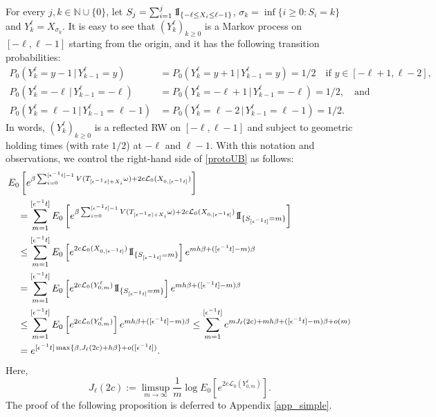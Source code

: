 \documentclass[a4paper]{amsart}
\numberwithin{equation}{section}
\theoremstyle{plain}
\theoremstyle{remark}
\begin{document}
For every $j,k\in\mathbb{N}\cup\{0\}$, let $S_j = \sum_{i=1}^j{{{\rm 1\mkern-1.5mu}\!{\rm I}}}_{\{-\ell \le X_i \le\ell-1\}}$, $\sigma_k = \inf\{i\ge0: S_i = k\}$ and $Y_k^\ell = X_{\sigma_k}$. It is easy to see that $(Y_k^\ell)_{k\ge0}$ is a Markov process on $[-\ell,\ell-1]$ starting from the origin, and it has the following transition probabilities:
\begin{equation}
\begin{aligned}\label{tantana}
P_0(Y_k^\ell = y - 1\,|\,Y_{k-1}^\ell = y) &= P_0(Y_k^\ell = y + 1\,|\,Y_{k-1}^\ell = y) = 1/2\quad\text{if $y\in[-\ell+1,\ell-2]$,}\\
P_0(Y_k^\ell = -\ell\,|\,Y_{k-1}^\ell = -\ell) &= P_0(Y_k^\ell = -\ell + 1\,|\,Y_{k-1}^\ell = -\ell) = 1/2,\quad\text{and}\\
P_0(Y_k^\ell = \ell-1\,|\,Y_{k-1}^\ell = \ell-1) &= P_0(Y_k^\ell = \ell-2\,|\,Y_{k-1}^\ell = \ell-1) = 1/2.
\end{aligned}
\end{equation}
In words, $(Y_k^\ell)_{k\ge0}$ is a reflected RW on $[-\ell,\ell-1]$ and subject to geometric holding times (with rate $1/2$) at $-\ell$ and $\ell-1$. 
With this notation and observations, we control the right-hand side of \eqref{protoUB} as follows:
\begin{align}
&E_0\left[e^{\beta\sum_{i=0}^{[{\epsilon^{-1}} t]-1}V(T_{[{\epsilon^{-1}} x] + X_i}\omega) + 2c\mathcal{L}_0(X_{0,[{\epsilon^{-1}} t]})}\right]\nonumber\\
&\quad = \sum_{m=1}^{[{\epsilon^{-1}} t]}E_0\left[e^{\beta\sum_{i=0}^{[{\epsilon^{-1}} t]-1}V(T_{[{\epsilon^{-1}} x] + X_i}\omega) + 2c\mathcal{L}_0(X_{0,[{\epsilon^{-1}} t]})}{{{\rm 1\mkern-1.5mu}\!{\rm I}}}_{\{S_{[{\epsilon^{-1}} t]} = m\}}\right]\nonumber\\
&\quad\le \sum_{m=1}^{[{\epsilon^{-1}} t]}E_0\left[e^{2c\mathcal{L}_0(X_{0,[{\epsilon^{-1}} t]})}{{{\rm 1\mkern-1.5mu}\!{\rm I}}}_{\{S_{[{\epsilon^{-1}} t]} = m\}}\right]e^{mh\beta + ([{\epsilon^{-1}} t]-m)\beta}\nonumber\\
&\quad = \sum_{m=1}^{[{\epsilon^{-1}} t]}E_0\left[e^{2c\mathcal{L}_0(Y_{0,m}^\ell)}{{{\rm 1\mkern-1.5mu}\!{\rm I}}}_{\{S_{[{\epsilon^{-1}} t]} = m\}}\right]e^{mh\beta + ([{\epsilon^{-1}} t]-m)\beta}\nonumber\\
&\quad\le \sum_{m=1}^{[{\epsilon^{-1}} t]} E_0\left[e^{2c\mathcal{L}_0(Y_{0,m}^\ell)}\right]e^{mh\beta + ([{\epsilon^{-1}} t]-m)\beta} \le \sum_{m=1}^{[{\epsilon^{-1}} t]} e^{mJ_\ell(2c) + mh\beta + ([{\epsilon^{-1}} t]-m)\beta + o(m)}\nonumber\\
&\quad = e^{[{\epsilon^{-1}} t]\max\left\{\beta,J_\ell(2c) + h\beta\right\} + o([{\epsilon^{-1}} t])}.\label{konsek}
\end{align}
Here,
$$J_\ell(2c) := \limsup_{m\to\infty}\frac1{m}\log E_0\left[e^{2c\mathcal{L}_0(Y_{0,m}^\ell)}\right].$$
The proof of the following proposition is deferred to Appendix \ref{app_simple}.
\end{document}
